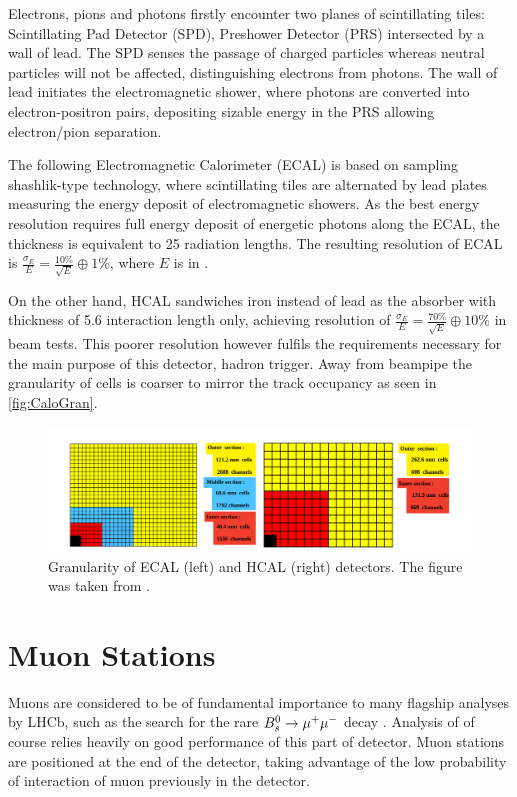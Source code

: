 Electrons, pions and photons firstly encounter two planes of scintillating tiles: Scintillating Pad Detector (\Gls{SPD}), Preshower Detector (\Gls{PRS}) intersected by a wall of lead. The \Gls{SPD} senses the passage of charged particles whereas neutral particles will not be affected, distinguishing electrons from photons. The wall of lead initiates the electromagnetic shower, where photons are converted into electron-positron pairs, depositing sizable energy in the \Gls{PRS} allowing electron/pion separation. 

The following Electromagnetic Calorimeter (\Gls{ECAL}) is based on sampling shashlik-type technology, where scintillating tiles are alternated by lead plates measuring the energy deposit of electromagnetic showers. As the best energy resolution requires full energy deposit of energetic photons along the \Gls{ECAL}, the thickness is equivalent to 25 radiation lengths. The resulting resolution of \Gls{ECAL} is $\frac{\sigma_{E}}{E} = \frac{10\%}{\sqrt{E}} \oplus 1\%$, where $E$ is in \gev.

On the other hand, \Gls{HCAL} sandwiches iron instead of lead as the absorber with thickness of 5.6 interaction length only, achieving resolution of $\frac{\sigma_{E}}{E} = \frac{70\%}{\sqrt{E}} \oplus 10\%$ in beam tests. This poorer resolution however fulfils the requirements necessary for the main purpose of this detector, hadron trigger. Away from beampipe the granularity of cells is coarser to mirror the track occupancy as seen in \autoref{fig:CaloGran}. 

\begin{figure}[!h]
	\centering
	\includegraphics[width = 1.0\textwidth]{figs/detector/CaloGran.png}%
	\caption{Granularity of \Gls{ECAL} (left) and \Gls{HCAL} (right) detectors. The figure was taken from \cite{det_paper}. }  
	\label{fig:CaloGran}
\end{figure}




\section{Muon Stations}
Muons are considered to be of fundamental importance to many flagship analyses by \Gls{LHCb}, such as the search for the rare ${B}^{0}_{s} \rightarrow \mu^{+} \mu^{-}$ decay . Analysis of \Bmumumu of course relies heavily on good performance of this part of detector. Muon stations are positioned at the end of the detector, taking advantage of the low probability of interaction of muon previously in the detector.

